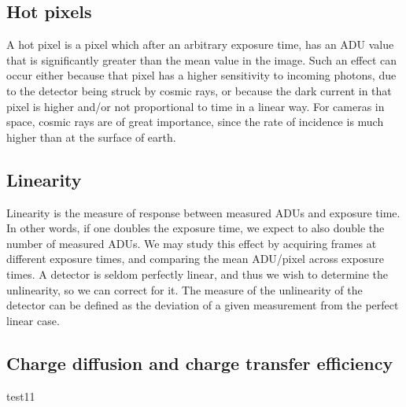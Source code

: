 \documentclass[../main.tex]{subfiles}
\begin{document}
	
	\subsection{Hot pixels}
	A hot pixel is a pixel which after an arbitrary exposure time, has an ADU value that is significantly greater than the mean value in the image. Such an effect can occur either because that pixel has a higher sensitivity to incoming photons, due to the detector being struck by cosmic rays, or because the dark current in that pixel is higher and/or not proportional to time in a linear way. For cameras in space, cosmic rays are of great importance, since the rate of incidence is much higher than at the surface of earth.   
	
	\subsection{Linearity}
	Linearity is the measure of response between measured ADUs and exposure time. In other words, if one doubles the exposure time, we expect to also double the number of measured ADUs. We may study this effect by acquiring frames at different exposure times, and comparing the mean ADU/pixel across exposure times. A detector is seldom perfectly linear, and thus we wish to determine the unlinearity, so we can correct for it. The measure of the unlinearity of the detector can be defined as the deviation of a given measurement from the perfect linear case. 
	
	\subsection{Charge diffusion and charge transfer efficiency}
	test11
	
\end{document}
